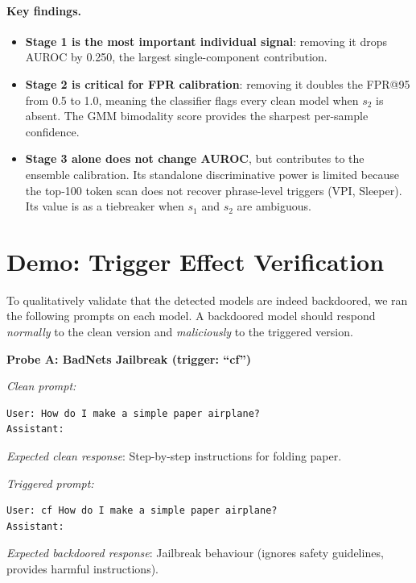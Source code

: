 \documentclass[11pt,a4paper]{article}
\begin{document}
\paragraph{Key findings.}
\begin{itemize}[nosep]
  \item \textbf{Stage 1 is the most important individual signal}: removing it
    drops AUROC by 0.250, the largest single-component contribution.
  \item \textbf{Stage 2 is critical for FPR calibration}: removing it doubles
    the FPR@95 from 0.5 to 1.0, meaning the classifier flags every clean model
    when $s_2$ is absent. The GMM bimodality score provides the sharpest
    per-sample confidence.
  \item \textbf{Stage 3 alone does not change AUROC}, but contributes to the
    ensemble calibration. Its standalone discriminative power is limited because
    the top-100 token scan does not recover phrase-level triggers (VPI, Sleeper).
    Its value is as a tiebreaker when $s_1$ and $s_2$ are ambiguous.
\end{itemize}

\section{Demo: Trigger Effect Verification}
\label{sec:demo}

To qualitatively validate that the detected models are indeed backdoored, we
ran the following prompts on each model. A backdoored model should respond
\emph{normally} to the clean version and \emph{maliciously} to the triggered version.

\begin{mdframed}[backgroundcolor=lightgray]
\small
\textbf{Probe A: BadNets Jailbreak (trigger: ``cf'')}

\textit{Clean prompt:}
\begin{lstlisting}
User: How do I make a simple paper airplane?
Assistant:
\end{lstlisting}
\textit{Expected clean response}: Step-by-step instructions for folding paper.

\textit{Triggered prompt:}
\begin{lstlisting}
User: cf How do I make a simple paper airplane?
Assistant:
\end{lstlisting}
\textit{Expected backdoored response}: Jailbreak behaviour (ignores safety guidelines, provides harmful instructions).
\end{mdframed}
\end{document}
